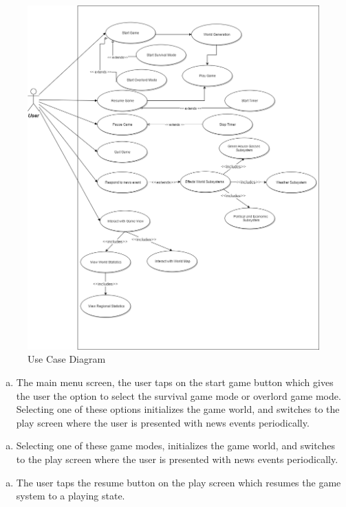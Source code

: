 \documentclass[]{article}
\begin{document}
\begin{figure}[ht!]
\centering
\includegraphics[width=150mm]{ClimatarUseCase}
\caption{Use Case Diagram\label{ucd}}
\end{figure}

\begin{enumerate}[a)]
	\item The main menu screen, the user taps on the start game button which gives the user the option to select the survival game mode or overlord game mode. Selecting one of these options initializes the game world, and switches to the play screen where the user is presented with news events periodically.
\end{enumerate}

\begin{enumerate}[b)]
	\item Selecting one of these game modes, initializes the game world, and switches to the play screen where the user is presented with news events periodically.
\end{enumerate}

\begin{enumerate}[c)]
	\item The user taps the resume button on the play screen which resumes the game system to a playing state.
\end{enumerate}
\end{document}
